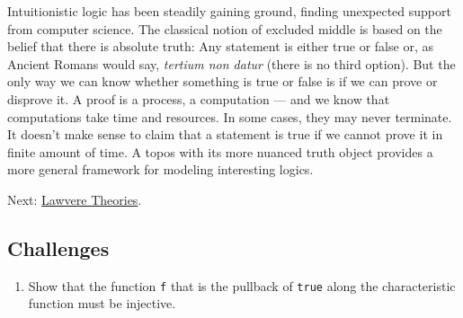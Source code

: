 Intuitionistic logic has been steadily gaining ground, finding
unexpected support from computer science. The classical notion of
excluded middle is based on the belief that there is absolute truth: Any
statement is either true or false or, as Ancient Romans would say,
\emph{tertium non datur} (there is no third option). But the only way we
can know whether something is true or false is if we can prove or
disprove it. A proof is a process, a computation --- and we know that
computations take time and resources. In some cases, they may never
terminate. It doesn't make sense to claim that a statement is true if we
cannot prove it in finite amount of time. A topos with its more nuanced
truth object provides a more general framework for modeling interesting
logics.

Next:
\href{https://bartoszmilewski.com/2017/08/26/lawvere-theories/}{Lawvere
Theories}.

\subsection{Challenges}\label{challenges}

\begin{enumerate}
\tightlist
\item
  Show that the function \texttt{f} that is the pullback of
  \texttt{true} along the characteristic function must be injective.
\end{enumerate}
